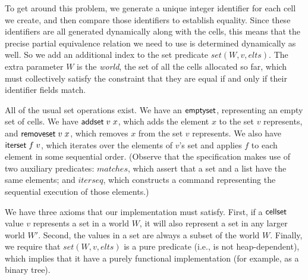 To get around this problem, we generate a unique integer identifier
for each cell we create, and then compare those identifiers to
establish equality. Since these identifiers are all generated
dynamically along with the cells, this means that the precise partial
equivalence relation we need to use is determined dynamically as
well. So we add an additional index to the set predicate $set(W, v,
elts)$. The extra parameter $W$ is the \emph{world}, the set of all
the cells allocated so far, which must collectively satisfy the
constraint that they are equal if and only if their identifier fields
match. 

All of the usual set operations exist. We have an $\mathsf{emptyset}$,
representing an empty set of cells. We have $\mathsf{addset}\;v\;x$,
which adds the element $x$ to the set $v$ represents, and
$\mathsf{removeset}\;v\;x$, which removes $x$ from the set $v$
represents. We also have $\mathsf{iterset}\;f\;v$, which iterates over
the elements of $v$'s set and applies $f$ to each element in some
sequential order. (Observe that the specification makes use of two 
auxiliary predicates: $matches$, which assert that a
set and a list have the same elements; and $iterseq$, which constructs
a command representing the sequential execution of those elements.) 

We have three axioms that our implementation must satisfy. First, if a
$\mathsf{cellset}$ value $v$ represents a set in a world $W$, it will also
represent a set in any larger world $W'$. Second, the values in a set
are always a subset of the world $W$. Finally, we require that
$set(W,v,elts)$ is a pure predicate (i.e., is not heap-dependent),
which implies that it have a purely functional implementation (for
example, as a binary tree). 


